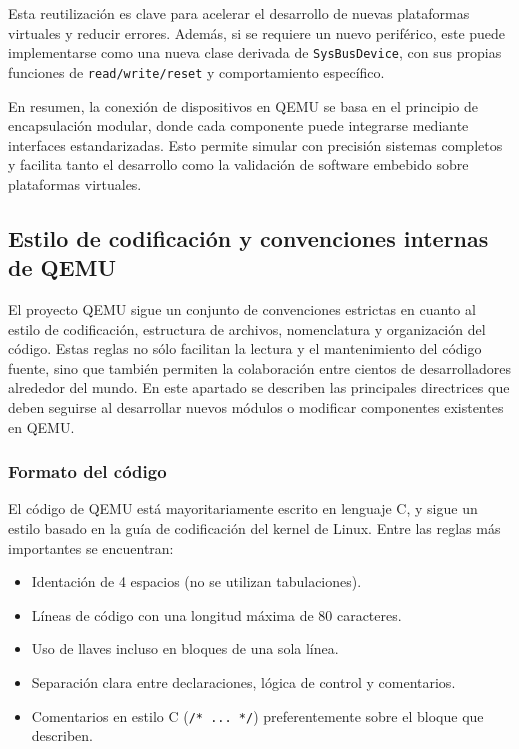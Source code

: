 Esta reutilización es clave para acelerar el desarrollo de nuevas plataformas virtuales y reducir errores. Además, si se requiere un nuevo periférico, este puede implementarse como una nueva clase derivada de \texttt{SysBusDevice}, con sus propias funciones de \texttt{read/write/reset} y comportamiento específico.

\vspace{1em}
En resumen, la conexión de dispositivos en QEMU se basa en el principio de encapsulación modular, donde cada componente puede integrarse mediante interfaces estandarizadas. Esto permite simular con precisión sistemas completos y facilita tanto el desarrollo como la validación de software embebido sobre plataformas virtuales.

\subsection{Estilo de codificación y convenciones internas de QEMU}
\label{subsec:convenciones-qemu}

El proyecto QEMU sigue un conjunto de convenciones estrictas en cuanto al estilo de codificación, estructura de archivos, nomenclatura y organización del código. Estas reglas no sólo facilitan la lectura y el mantenimiento del código fuente, sino que también permiten la colaboración entre cientos de desarrolladores alrededor del mundo. En este apartado se describen las principales directrices que deben seguirse al desarrollar nuevos módulos o modificar componentes existentes en QEMU.

\subsubsection*{Formato del código}

El código de QEMU está mayoritariamente escrito en lenguaje C, y sigue un estilo basado en la guía de codificación del kernel de Linux. Entre las reglas más importantes se encuentran:

\begin{itemize}
  \item Identación de 4 espacios (no se utilizan tabulaciones).
  \item Líneas de código con una longitud máxima de 80 caracteres.
  \item Uso de llaves incluso en bloques de una sola línea.
  \item Separación clara entre declaraciones, lógica de control y comentarios.
  \item Comentarios en estilo C (\texttt{/* ... */}) preferentemente sobre el bloque que describen.
\end{itemize}

